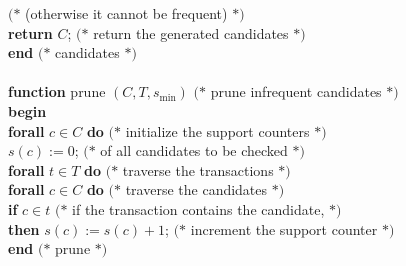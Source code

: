 \documentclass{article}
\begin{document}
\begin{tabbing}
   \>\>\>\>   $(*$ (otherwise it cannot be frequent) $*)$ \\
\> {\bf return} $C$;
   \>\>\>\>   $(*$ return the generated candidates $*)$ \\
{\bf end} $(*$ candidates $*)$ \\
\\
{\bf function} prune $(C, T, s_{\min})$
   \>\>\>\>\> $(*$ prune infrequent candidates $*)$ \\
{\bf begin} \\
\> {\bf forall} $c \in C$ {\bf do}
   \>\>\>\>   $(*$ initialize the support counters $*)$ \\
\> \> $s(c) := 0$;
   \>\>\>     $(*$ of all candidates to be checked $*)$ \\
\> {\bf forall} $t \in T$ {\bf do}
   \>\>\>\>   $(*$ traverse the transactions $*)$ \\
\> \> {\bf forall} $c \in C$ {\bf do}
   \>\>\>     $(*$ traverse the candidates $*)$ \\
\> \> \> {\bf if} $c \in t$
   \>\>       $(*$ if the transaction contains the candidate, $*)$ \\
\> \> \> {\bf then} $s(c) := s(c) +1$;
   \>\>       $(*$ increment the support counter $*)$ \\
{\bf end} $(*$ prune $*)$
\end{tabbing}
\end{document}

